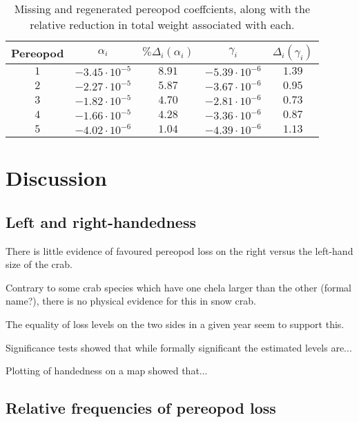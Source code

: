 \documentclass[letterpaper, 10pt]{article}
\begin{document}
\begin{table}[h!]
  \begin{center}
    \begin{tabular}{c | c c | c c} 
    Pereopod & $\alpha_i$ & $\%\Delta_i(\alpha_i)$ & $\gamma_i$ & $\Delta_i(\gamma_i)$ \\    
    \hline 
    $1$ & $-3.45 \cdot 10^{-5}$ & $8.91$ & $-5.39 \cdot 10^{-6}$  & $1.39$ \\
    $2$ & $-2.27 \cdot 10^{-5}$ & $5.87$ & $-3.67 \cdot 10^{-6}$  & $0.95$ \\
    $3$ & $-1.82 \cdot 10^{-5}$ & $4.70$ & $-2.81 \cdot 10^{-6}$  & $0.73$ \\
    $4$ & $-1.66 \cdot 10^{-5}$ & $4.28$ & $-3.36 \cdot 10^{-6}$  & $0.87$ \\
    $5$ & $-4.02 \cdot 10^{-6}$ & $1.04$ & $-4.39 \cdot 10^{-6}$  & $1.13$ \\
    \hline
    \end{tabular}
  \end{center}
  \caption{Missing and regenerated pereopod coeffcients, along with the relative reduction in total
           weight associated with each.}
\end{table}


\section{Discussion}

\subsection{Left and right-handedness}

There is little evidence of favoured pereopod loss on the right versus the left-hand size of the crab.  

Contrary to some crab species which have one chela larger than the other (formal name?), there is no physical evidence for this in snow crab. 

The equality of loss levels on the two sides in a given year seem to support this.

Significance tests showed that while formally significant the estimated levels are...

Plotting of handedness on a map showed that...

\subsection{Relative frequencies of pereopod loss}
\end{document}
